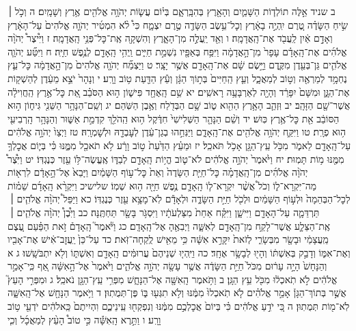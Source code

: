 \documentclass[twoside, openany, parskip=half, 11pt]{book}
\begin{document}
ב שניד אֵ֣לֶּה תוֹלְד֧וֹת הַשָּׁמַ֛יִם וְהָאָ֖רֶץ בְּהִבָּֽרְאָ֑ם בְּי֗וֹם עֲשׂ֛וֹת יְהֹוָ֥ה אֱלֹהִ֖ים אֶ֥רֶץ וְשָׁמָֽיִם׃ ה וְכֹ֣ל ׀ שִׂ֣יחַ הַשָּׂדֶ֗ה טֶ֚רֶם יִֽהְיֶ֣ה בָאָ֔רֶץ וְכׇל־עֵ֥שֶׂב הַשָּׂדֶ֖ה טֶ֣רֶם יִצְמָ֑ח כִּי֩ לֹ֨א הִמְטִ֜יר יְהֹוָ֤ה אֱלֹהִים֙ עַל־הָאָ֔רֶץ וְאָדָ֣ם אַ֔יִן לַֽעֲבֹ֖ד אֶת־הָֽאֲדָמָֽה׃ ו וְאֵ֖ד יַֽעֲלֶ֣ה מִן־הָאָ֑רֶץ וְהִשְׁקָ֖ה אֶֽת־כׇּל־פְּנֵ֥י הָֽאֲדָמָֽה׃ ז וַיִּ֩יצֶר֩ יְהֹוָ֨ה אֱלֹהִ֜ים אֶת־הָֽאָדָ֗ם עָפָר֙ מִן־הָ֣אֲדָמָ֔ה וַיִּפַּ֥ח בְּאַפָּ֖יו נִשְׁמַ֣ת חַיִּ֑ים וַֽיְהִ֥י הָֽאָדָ֖ם לְנֶ֥פֶשׁ חַיָּֽה׃ ח וַיִּטַּ֞ע יְהֹוָ֧ה אֱלֹהִ֛ים גַּן־בְּעֵ֖דֶן מִקֶּ֑דֶם וַיָּ֣שֶׂם שָׁ֔ם אֶת־הָֽאָדָ֖ם אֲשֶׁ֥ר יָצָֽר׃ ט וַיַּצְמַ֞ח יְהֹוָ֤ה אֱלֹהִים֙ מִן־הָ֣אֲדָמָ֔ה כׇּל־עֵ֛ץ נֶחְמָ֥ד לְמַרְאֶ֖ה וְט֣וֹב לְמַאֲכָ֑ל וְעֵ֤ץ הַֽחַיִּים֙ בְּת֣וֹךְ הַגָּ֔ן וְעֵ֕ץ הַדַּ֖עַת ט֥וֹב וָרָֽע׃ י וְנָהָר֙ יֹצֵ֣א מֵעֵ֔דֶן לְהַשְׁק֖וֹת אֶת־הַגָּ֑ן וּמִשָּׁם֙ יִפָּרֵ֔ד וְהָיָ֖ה לְאַרְבָּעָ֥ה רָאשִֽׁים׃ יא שֵׁ֥ם הָֽאֶחָ֖ד פִּישׁ֑וֹן ה֣וּא הַסֹּבֵ֗ב אֵ֚ת כׇּל־אֶ֣רֶץ הַֽחֲוִילָ֔ה אֲשֶׁר־שָׁ֖ם הַזָּהָֽב׃ יב וּֽזְהַ֛ב הָאָ֥רֶץ הַהִ֖וא ט֑וֹב שָׁ֥ם הַבְּדֹ֖לַח וְאֶ֥בֶן הַשֹּֽׁהַם׃ יג וְשֵֽׁם־הַנָּהָ֥ר הַשֵּׁנִ֖י גִּיח֑וֹן ה֣וּא הַסּוֹבֵ֔ב אֵ֖ת כׇּל־אֶ֥רֶץ כּֽוּשׁ׃ יד וְשֵׁ֨ם הַנָּהָ֤ר הַשְּׁלִישִׁי֙ חִדֶּ֔קֶל ה֥וּא הַֽהֹלֵ֖ךְ קִדְמַ֣ת אַשּׁ֑וּר וְהַנָּהָ֥ר הָֽרְבִיעִ֖י ה֥וּא פְרָֽת׃ טו וַיִּקַּ֛ח יְהֹוָ֥ה אֱלֹהִ֖ים אֶת־הָֽאָדָ֑ם וַיַּנִּחֵ֣הוּ בְגַן־עֵ֔דֶן לְעׇבְדָ֖הּ וּלְשׇׁמְרָֽהּ׃ טז וַיְצַו֙ יְהֹוָ֣ה אֱלֹהִ֔ים עַל־הָֽאָדָ֖ם לֵאמֹ֑ר מִכֹּ֥ל עֵֽץ־הַגָּ֖ן אָכֹ֥ל תֹּאכֵֽל׃ יז וּמֵעֵ֗ץ הַדַּ֙עַת֙ ט֣וֹב וָרָ֔ע לֹ֥א תֹאכַ֖ל מִמֶּ֑נּוּ כִּ֗י בְּי֛וֹם אֲכׇלְךָ֥ מִמֶּ֖נּוּ מ֥וֹת תָּמֽוּת׃ יח וַיֹּ֙אמֶר֙ יְהֹוָ֣ה אֱלֹהִ֔ים לֹא־ט֛וֹב הֱי֥וֹת הָֽאָדָ֖ם לְבַדּ֑וֹ אֶֽעֱשֶׂה־לּ֥וֹ עֵ֖זֶר כְּנֶגְדּֽוֹ׃ יט וַיִּ֩צֶר֩ יְהֹוָ֨ה אֱלֹהִ֜ים מִן־הָֽאֲדָמָ֗ה כׇּל־חַיַּ֤ת הַשָּׂדֶה֙ וְאֵת֙ כׇּל־ע֣וֹף הַשָּׁמַ֔יִם וַיָּבֵא֙ אֶל־הָ֣אָדָ֔ם לִרְא֖וֹת מַה־יִּקְרָא־ל֑וֹ וְכֹל֩ אֲשֶׁ֨ר יִקְרָא־ל֧וֹ הָֽאָדָ֛ם נֶ֥פֶשׁ חַיָּ֖ה ה֥וּא שְׁמֽוֹ׃ שלישיכ וַיִּקְרָ֨א הָֽאָדָ֜ם שֵׁמ֗וֹת לְכׇל־הַבְּהֵמָה֙ וּלְע֣וֹף הַשָּׁמַ֔יִם וּלְכֹ֖ל חַיַּ֣ת הַשָּׂדֶ֑ה וּלְאָדָ֕ם לֹֽא־מָצָ֥א עֵ֖זֶר כְּנֶגְדּֽוֹ׃ כא וַיַּפֵּל֩ יְהֹוָ֨ה אֱלֹהִ֧ים ׀ תַּרְדֵּמָ֛ה עַל־הָאָדָ֖ם וַיִּישָׁ֑ן וַיִּקַּ֗ח אַחַת֙ מִצַּלְעֹתָ֔יו וַיִּסְגֹּ֥ר בָּשָׂ֖ר תַּחְתֶּֽנָּה׃ כב וַיִּ֩בֶן֩ יְהֹוָ֨ה אֱלֹהִ֧ים ׀ אֶֽת־הַצֵּלָ֛ע אֲשֶׁר־לָקַ֥ח מִן־הָֽאָדָ֖ם לְאִשָּׁ֑ה וַיְבִאֶ֖הָ אֶל־הָֽאָדָֽם׃ כג וַיֹּ֘אמֶר֮ הָֽאָדָם֒ זֹ֣את הַפַּ֗עַם עֶ֚צֶם מֵֽעֲצָמַ֔י וּבָשָׂ֖ר מִבְּשָׂרִ֑י לְזֹאת֙ יִקָּרֵ֣א אִשָּׁ֔ה כִּ֥י מֵאִ֖ישׁ לֻֽקְחָה־זֹּֽאת׃ כד עַל־כֵּן֙ יַֽעֲזׇב־אִ֔ישׁ אֶת־אָבִ֖יו וְאֶת־אִמּ֑וֹ וְדָבַ֣ק בְּאִשְׁתּ֔וֹ וְהָי֖וּ לְבָשָׂ֥ר אֶחָֽד׃ כה וַיִּֽהְי֤וּ שְׁנֵיהֶם֙ עֲרוּמִּ֔ים הָֽאָדָ֖ם וְאִשְׁתּ֑וֹ וְלֹ֖א יִתְבֹּשָֽׁשׁוּ׃ ג א וְהַנָּחָשׁ֙ הָיָ֣ה עָר֔וּם מִכֹּל֙ חַיַּ֣ת הַשָּׂדֶ֔ה אֲשֶׁ֥ר עָשָׂ֖ה יְהֹוָ֣ה אֱלֹהִ֑ים וַיֹּ֙אמֶר֙ אֶל־הָ֣אִשָּׁ֔ה אַ֚ף כִּֽי־אָמַ֣ר אֱלֹהִ֔ים לֹ֣א תֹֽאכְל֔וּ מִכֹּ֖ל עֵ֥ץ הַגָּֽן׃ ב וַתֹּ֥אמֶר הָֽאִשָּׁ֖ה אֶל־הַנָּחָ֑שׁ מִפְּרִ֥י עֵֽץ־הַגָּ֖ן נֹאכֵֽל׃ ג וּמִפְּרִ֣י הָעֵץ֮ אֲשֶׁ֣ר בְּתוֹךְ־הַגָּן֒ אָמַ֣ר אֱלֹהִ֗ים לֹ֤א תֹֽאכְלוּ֙ מִמֶּ֔נּוּ וְלֹ֥א תִגְּע֖וּ בּ֑וֹ פֶּן־תְּמֻתֽוּן׃ ד וַיֹּ֥אמֶר הַנָּחָ֖שׁ אֶל־הָֽאִשָּׁ֑ה לֹֽא־מ֖וֹת תְּמֻתֽוּן׃ ה כִּ֚י יֹדֵ֣עַ אֱלֹהִ֔ים כִּ֗י בְּיוֹם֙ אֲכׇלְכֶ֣ם מִמֶּ֔נּוּ וְנִפְקְח֖וּ עֵֽינֵיכֶ֑ם וִהְיִיתֶם֙ כֵּֽאלֹהִ֔ים יֹדְעֵ֖י ט֥וֹב וָרָֽע׃ ו וַתֵּ֣רֶא הָֽאִשָּׁ֡ה כִּ֣י טוֹב֩ הָעֵ֨ץ לְמַאֲכָ֜ל וְכִ֧י 
\end{document}
